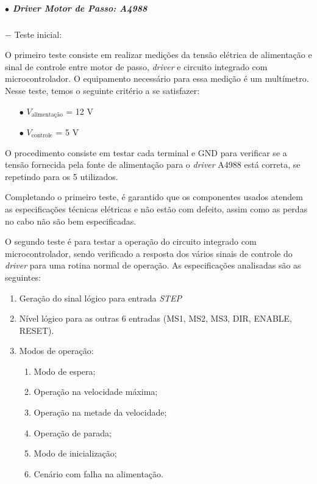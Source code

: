\subparagraph*{$\bullet$ \textit{Driver} Motor de Passo: A4988} \hfill

\subparagraph*{} $-$ Teste inicial:\label{sec:teste_inicial}

O primeiro teste consiste em realizar medições da tensão elétrica de alimentação e sinal de controle entre motor de passo, \textit{driver} e circuito integrado com microcontrolador.  O equipamento necessário para essa medição é um multímetro. Nesse teste, temos o seguinte critério a se satisfazer:


\begin{itemize}
    \item[$\bullet$] $V_\text{alimentação}$ = 12 V
    \item[$\bullet$] $V_\text{controle}$ = 5 V 
\end{itemize}

O procedimento consiste em testar cada terminal e GND para verificar se a tensão fornecida pela fonte de alimentação para o \textit{driver} A4988 está correta, se repetindo para os 5 utilizados.

Completando o primeiro teste, é garantido que os componentes usados atendem as especificações técnicas elétricas e não estão com defeito, assim como as perdas no cabo não são bem especificadas.

O segundo teste é para testar a operação do circuito integrado com microcontrolador, sendo verificado a resposta dos vários sinais de controle do \textit{driver} para uma rotina normal de operação. As especificações analisadas são as seguintes:

\begin{enumerate}
    \item Geração do sinal lógico para entrada \textit{STEP}
    \item Nível lógico para as outras 6 entradas (MS1, MS2, MS3, DIR, ENABLE, RESET).
    \item Modos de operação:
    \begin{enumerate}
        \item Modo de espera;
        \item Operação na velocidade máxima;
        \item Operação na metade da velocidade;
        \item Operação de parada;
        \item Modo de inicialização;
        \item Cenário com falha na alimentação.
    \end{enumerate}
\end{enumerate}


